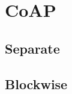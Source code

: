 \chapter{CoAP}
\label{chp:coap}

\section{Separate}
\label{chp:coap-separate}

\section{Blockwise}
\label{chp:coap-blockwise}
